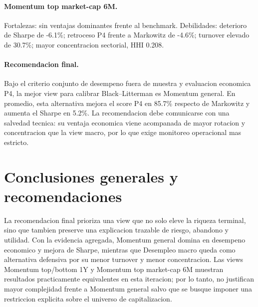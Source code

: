 \documentclass[11pt]{article}
\begin{document}
\paragraph{Momentum top market-cap 6M.} Fortalezas: sin ventajas dominantes frente al benchmark. Debilidades: deterioro de Sharpe de -6.1\%; retroceso P4 frente a Markowitz de -4.6\%; turnover elevado de 30.7\%; mayor concentracion sectorial, HHI 0.208.

\paragraph{Recomendacion final.} Bajo el criterio conjunto de desempeno fuera de muestra y evaluacion economica P4, la mejor view para calibrar Black--Litterman es Momentum general. En promedio, esta alternativa mejora el score P4 en 85.7\% respecto de Markowitz y aumenta el Sharpe en 5.2\%. La recomendacion debe comunicarse con una salvedad tecnica: su ventaja economica viene acompanada de mayor rotacion y concentracion que la view macro, por lo que exige monitoreo operacional mas estricto.

\section{Conclusiones generales y recomendaciones}

La recomendacion final prioriza una view que no solo eleve la riqueza terminal, sino que tambien preserve una explicacion trazable de riesgo, abandono y utilidad. Con la evidencia agregada, Momentum general domina en desempeno economico y mejora de Sharpe, mientras que Desempleo macro queda como alternativa defensiva por su menor turnover y menor concentracion. Las views Momentum top/bottom 1Y y Momentum top market-cap 6M muestran resultados practicamente equivalentes en esta iteracion; por lo tanto, no justifican mayor complejidad frente a Momentum general salvo que se busque imponer una restriccion explicita sobre el universo de capitalizacion.
\end{document}
